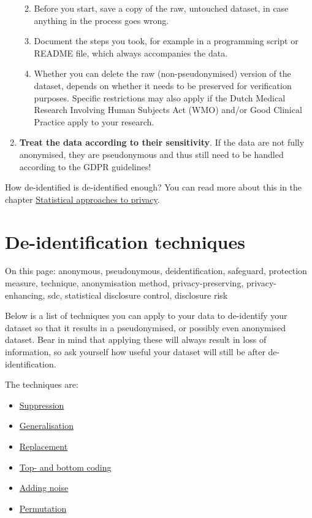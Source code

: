 \documentclass[
]{book}
\providecommand{\tightlist}{%
  \setlength{\itemsep}{0pt}\setlength{\parskip}{0pt}}
\begin{document}
\begin{enumerate}
  \begin{enumerate}
  \def\labelenumii{\alph{enumii}.}
  \tightlist
  \item
    Before you start, save a copy of the raw, untouched dataset, in case
    anything in the process goes wrong.
  \item
    Document the steps you took, for example in a programming script or README
    file, which always accompanies the data.
  \item
    Whether you can delete the raw (non-pseudonymised) version of the dataset,
    depends on whether it needs to be preserved for verification purposes. Specific
    restrictions may also apply if the Dutch Medical Research Involving Human
    Subjects Act (WMO) and/or Good Clinical Practice apply to your research.
  \end{enumerate}
\item
  \textbf{Treat the data according to their sensitivity}. If the data are not fully
  anonymised, they are pseudonymous and thus still need to be handled according to
  the GDPR guidelines!
\end{enumerate}

How de-identified is de-identified enough? You can read more about this in the
chapter \protect\hyperlink{statistical-privacy}{Statistical approaches to privacy}.

\hypertarget{deidentification-techniques}{%
\section{De-identification techniques}\label{deidentification-techniques}}

On this page: anonymous, pseudonymous, deidentification, safeguard, protection
measure, technique, anonymisation method, privacy-preserving, privacy-enhancing,
sdc, statistical disclosure control, disclosure risk

Below is a list of techniques you can apply to your data to de-identify your
dataset so that it results in a pseudonymised, or possibly even anonymised
dataset. Bear in mind that applying these will always result in loss of
information, so ask yourself how useful your dataset will still be after
de-identification.

The techniques are:

\begin{itemize}
\tightlist
\item
  \protect\hyperlink{suppression}{Suppression}
\item
  \protect\hyperlink{generalisation}{Generalisation}
\item
  \protect\hyperlink{replacement}{Replacement}
\item
  \protect\hyperlink{top-bottom-coding}{Top- and bottom coding}
\item
  \protect\hyperlink{adding-noise}{Adding noise}
\item
  \protect\hyperlink{permutation}{Permutation}
\end{itemize}
\end{document}
